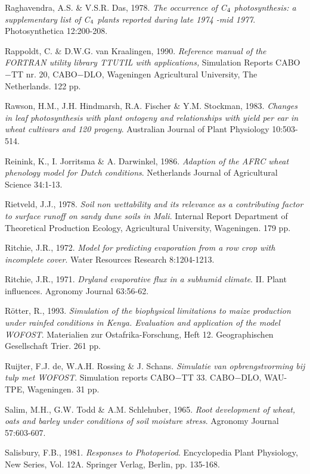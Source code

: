 Raghavendra, A.S. \& V.S.R. Das, 1978. {\it The occurrence of C$_{{\rm 4}}$ photosynthesis: a supplementary list
of C$_{{\rm 4}}$ plants reported during late 1974 -mid 1977\/}. Photosynthetica 12:200-208.

Rappoldt, C. \& D.W.G. van Kraalingen, 1990. {\it Reference manual of the FORTRAN utility library
TTUTIL with applications,\/} Simulation Reports CABO$-$TT nr. 20, CABO$-$DLO, Wageningen
Agricultural University, The Netherlands. 122 pp. 

Rawson, H.M., J.H. Hindmarsh, R.A. Fischer \& Y.M. Stockman, 1983. {\it Changes in leaf
photosynthesis with plant ontogeny and relationships with yield per ear in wheat cultivars and 120
progeny\/}. Australian Journal of Plant Physiology 10:503-514.

Reinink, K., I. Jorritsma \& A. Darwinkel, 1986. {\it Adaption of the AFRC wheat phenology model for
Dutch conditions\/}. Netherlands Journal of Agricultural Science 34:1-13.

Rietveld, J.J., 1978. {\it Soil non wettability and its relevance as a contributing factor to surface runoff
on sandy dune soils in Mali\/}. Internal Report Department of Theoretical Production Ecology,
Agricultural University, Wageningen. 179 pp.

Ritchie, J.R., 1972. {\it Model for predicting evaporation from a row crop with incomplete cover\/}. Water
Resources Research 8:1204-1213.

Ritchie, J.R., 1971. {\it Dryland evaporative flux in a subhumid climate\/}. II. Plant influences. Agronomy
Journal 63:56-62.

R\"{o}tter, R., 1993. {\it Simulation of the biophysical limitations to maize production under rainfed
conditions in Kenya. Evaluation and application of the model WOFOST\/}. {\nobreak}Materialien zur Ostafrika-Forschung, Heft 12. {\nobreak}Geographischen Gesellschaft Trier. 261 pp.

Ruijter, F.J. de, W.A.H. Rossing \& J. Schans. {\it Simulatie van opbrengstvorming bij tulp met
WOFOST\/}. Simula\-tion reports CABO$-$TT 33. CABO$-$DLO, WAU-TPE, Wageningen. 31 pp.

Salim, M.H., G.W. Todd \& A.M. Schlehuber, 1965. {\it Root development of wheat, oats and barley
under conditions of soil moisture stress\/}. Agronomy Journal 57:603-607.

Salisbury, F.B., 1981. {\it Responses to Photoperiod\/}. Encyclopedia Plant Physiology, New Series, Vol.
12A. Springer Verlag, Berlin, pp. 135-168.

